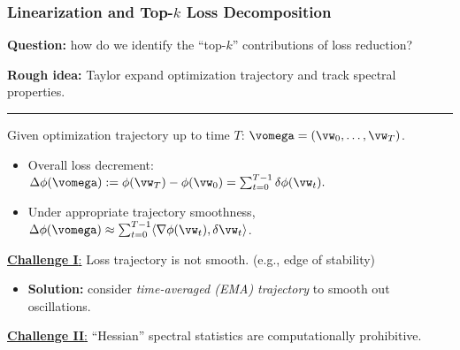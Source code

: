 \begin{frame}
\frametitle{Linearization and Top-$k$ Loss Decomposition}
\vspace{1.5mm}

{

\begin{block}{}
\centering
\textbf{Question:} how do we identify the ``top-$k$'' contributions of loss reduction? 
\end{block}


\small

\vspace{-1.2mm}

{\small \color{lightgray!60!black} \textbf{Rough idea:} Taylor expand optimization trajectory and track spectral properties.}

\vspace{2.5mm}
\hrule
\vspace{1.5mm}

{

\color{lightgray!60!black}

Given optimization trajectory up to time $T$:  $\vomega = (\vw_0, \ldots, \vw_T)$. 
\vspace{-0.8mm}
\begin{itemize}\setlength\itemsep{0.35em} \color{lightgray!60!black}
    \item Overall loss decrement: $\Delta \phi(\vomega) := \phi(\vw_T) - \phi(\vw_0) = \sum_{t=0}^{T-1} \delta \phi(\vw_t).$
    \item Under appropriate trajectory smoothness, 
    $\Delta \phi(\vomega) \approx \sum_{t=0}^{T-1}\langle\nabla \phi(\vw_t), \delta\vw_t\rangle$. 
\end{itemize}

}

\vspace{1mm}

\pause 

\colorbox{red!12}{\underline{\textbf{Challenge I}:}} Loss trajectory is not smooth. {\color{lightgray!60!black}(e.g., edge of stability) }

\begin{itemize}\small 
    \item[\ding{112}] \textbf{Solution:} consider \textit{\color{FlatironOrange!66!gray}time-averaged (EMA) trajectory} to smooth out oscillations. 
\end{itemize}

\vspace{1mm}

\colorbox{red!12}{\underline{\textbf{Challenge II}:}} ``Hessian'' spectral statistics are computationally prohibitive.}


\end{frame}
